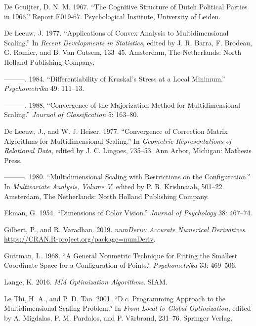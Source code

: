 \documentclass[
  12pt,
]{article}
\newlength{\cslhangindent}
\newenvironment{CSLReferences}[2] %
 {\begin{list}{}{%
  \setlength{\itemindent}{0pt}
  \setlength{\leftmargin}{0pt}
  \setlength{\parsep}{0pt}
  \ifodd #1
   \setlength{\leftmargin}{\cslhangindent}
   \setlength{\itemindent}{-1\cslhangindent}
  \fi
  \setlength{\itemsep}{#2\baselineskip}}}
 {\end{list}}
\begin{document}
\label{refs}
\begin{CSLReferences}{1}{0}
De Gruijter, D. N. M. 1967. {``{The Cognitive Structure of Dutch Political Parties in 1966}.''} Report E019-67. Psychological Institute, University of Leiden.

De Leeuw, J. 1977. {``Applications of Convex Analysis to Multidimensional Scaling.''} In \emph{Recent Developments in Statistics}, edited by J. R. Barra, F. Brodeau, G. Romier, and B. Van Cutsem, 133--45. Amsterdam, The Netherlands: North Holland Publishing Company.

---------. 1984. {``{Differentiability of Kruskal's Stress at a Local Minimum}.''} \emph{Psychometrika} 49: 111--13.

---------. 1988. {``Convergence of the Majorization Method for Multidimensional Scaling.''} \emph{Journal of Classification} 5: 163--80.

De Leeuw, J., and W. J. Heiser. 1977. {``Convergence of Correction Matrix Algorithms for Multidimensional Scaling.''} In \emph{Geometric Representations of Relational Data}, edited by J. C. Lingoes, 735--53. Ann Arbor, Michigan: Mathesis Press.

---------. 1980. {``Multidimensional Scaling with Restrictions on the Configuration.''} In \emph{Multivariate Analysis, Volume {V}}, edited by P. R. Krishnaiah, 501--22. Amsterdam, The Netherlands: North Holland Publishing Company.

Ekman, G. 1954. {``{Dimensions of Color Vision}.''} \emph{Journal of Psychology} 38: 467--74.

Gilbert, P., and R. Varadhan. 2019. \emph{{numDeriv: Accurate Numerical Derivatives}}. \url{https://CRAN.R-project.org/package=numDeriv}.

Guttman, L. 1968. {``{A General Nonmetric Technique for Fitting the Smallest Coordinate Space for a Configuration of Points}.''} \emph{Psychometrika} 33: 469--506.

Lange, K. 2016. \emph{MM Optimization Algorithms}. SIAM.

Le Thi, H. A., and P. D. Tao. 2001. {``D.c. Programming Approach to the Multidimensional Scaling Problem.''} In \emph{From Local to Global Optimization}, edited by A. Migdalas, P. M. Pardalos, and P. Värbrand, 231--76. Springer Verlag.


\end{CSLReferences}
\end{document}
